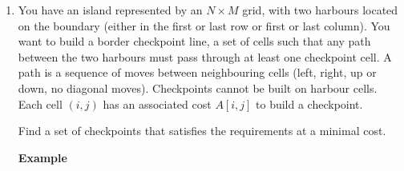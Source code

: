 \documentclass{article}
\begin{document}
\begin{enumerate}
\item
You have an island represented by an $N \times M$ grid, with two harbours located on the boundary (either in the first or last row or first or last column). You want to build a border checkpoint line, a set of cells such that any path between the two harbours must pass through at least one checkpoint cell. A path is a sequence of moves between neighbouring cells (left, right, up or down, no diagonal moves). Checkpoints cannot be built on harbour cells. Each cell $(i,j)$ has an associated cost $A[i,j]$ to build a checkpoint. 

Find a set of checkpoints that satisfies the requirements at a minimal cost.

\textbf{Example}

\begin{center}
\end{center}
\end{enumerate}
\end{document}
